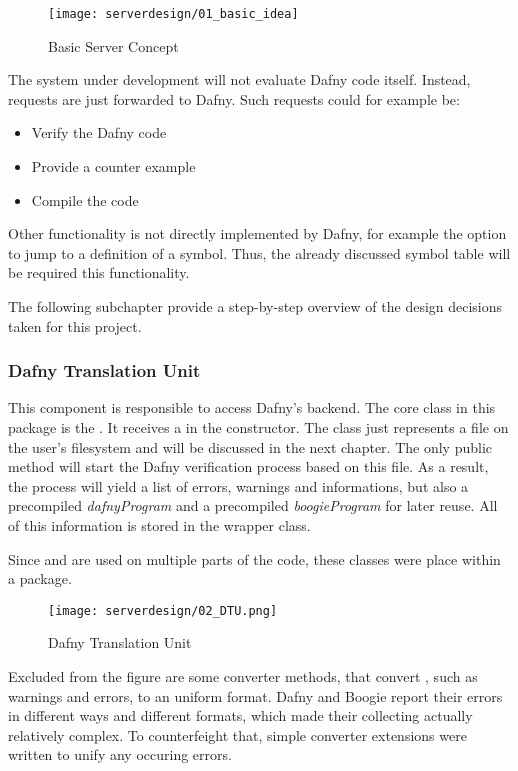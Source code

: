\begin{figure}[H]
    \centering
    \texttt{[image: serverdesign/01\_basic\_idea]}
    \caption{Basic Server Concept}
    \label{fig:server_basic_idea}
\end{figure}

The system under development will not evaluate Dafny code itself. Instead, requests are just forwarded to Dafny. Such requests could for example be:
\begin{itemize}
    \item Verify the Dafny code
    \item Provide a counter example
    \item Compile the code
\end{itemize}

Other functionality is not directly implemented by Dafny, for example the option to jump to a definition of a symbol. Thus, the already discussed symbol table will be required this functionality.

The following subchapter provide a step-by-step overview of the design decisions taken for this project.

\subsubsection{Dafny Translation Unit}
This component is responsible to access Dafny's backend. The core class in this package is the . It receives a  in the constructor. The class  just represents a file on the user's filesystem and will be discussed in the next chapter. The only public method  will start the Dafny verification process based on this file. As a result, the process will yield a list of errors, warnings and informations, but also a precompiled \textit{dafnyProgram} and a precompiled \textit{boogieProgram} for later reuse. All of this information is stored in the  wrapper class.

Since  and  are used on multiple parts of the code, these classes were place within a  package.

\begin{figure}[H]
    \centering
    \texttt{[image: serverdesign/02\_DTU.png]}
    \caption{Dafny Translation Unit}
    \label{fig:server_dtu}
\end{figure}

Excluded from the figure are some converter methods, that convert , such as warnings and errors, to an uniform format. Dafny and Boogie report their errors in different ways and different formats, which made their collecting actually relatively complex. To counterfeight that, simple converter extensions were written to unify any occuring errors.

